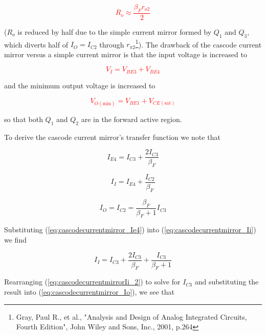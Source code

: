 \textcolor{red}{
\begin{equation}
R_{o} \approx \frac{\beta_{F} r_{o2}}{2}
\end{equation}
}

($R_{o}$ is reduced by half due to the simple current mirror formed by $Q_{1}$ and $Q_{3}$, which diverts half of $I_{O} = I_{C2}$ through $r_{\pi 2}$\footnote{Gray, Paul R., et al., "Analysis and Design of Analog Integrated Circuits, Fourth Edition", John Wiley and Sons, Inc., 2001, p.264}). The drawback of the cascode current mirror versus a simple current mirror is that the input voltage is increased to

\textcolor{red}{
\begin{equation}
V_{I} = V_{BE3} + V_{BE4}
\end{equation}
}

and the minimum output voltage is increased to

\textcolor{red}{
\begin{equation}
V_{O(\text{min})} = V_{BE1} + V_{CE(\text{sat})}
\end{equation}
}

so that both $Q_{1}$ and $Q_{2}$ are in the forward active region.
\par To derive the cascode current mirror's transfer function we note that

\begin{equation}
I_{E4} = I_{C3}+\frac{2I_{C3}}{\beta_{F}}
\label{eq:cascodecurrentmirror_Ie4}
\end{equation}

\begin{equation}
I_{I} = I_{E4}+\frac{I_{C2}}{\beta_{F}}
\label{eq:cascodecurrentmirror_Ii}
\end{equation}

\begin{equation}
I_{O} = I_{C2} = \frac{\beta_{F}}{\beta_{F} + 1}I_{C3}
\label{eq:cascodecurrentmirror_Io}
\end{equation}

Substituting (\ref{eq:cascodecurrentmirror_Ie4}) into (\ref{eq:cascodecurrentmirror_Ii}) we find

\begin{equation}
I_{I} = I_{C3} + \frac{2I_{C3}}{\beta_{F}} + \frac{I_{C3}}{\beta_{F} + 1}
\label{eq:cascodecurrentmirrorIi_2}
\end{equation}

Rearranging (\ref{eq:cascodecurrentmirrorIi_2}) to solve for $I_{C3}$ and substituting the result into (\ref{eq:cascodecurrentmirror_Io}), we see that

